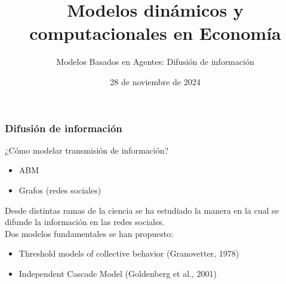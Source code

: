 \documentclass[11pt]{beamer}
\begin{document}
	\title{Modelos dinámicos y computacionales en Economía}
	\subtitle{Modelos Basados en Agentes: Difusión de información}
	\date{28 de noviembre de 2024}




\begin{frame}
	\frametitle{Difusión de información}
	¿Cómo modelar transmisión de información?
	\begin{itemize}
		\item<2-> ABM
		\item<3-> Grafos (redes sociales)
	\end{itemize}
	\vspace{2mm}
	Desde distintas ramas de la ciencia se ha estudiado la manera en la cual se difunde la información en las redes sociales.\\
	Dos modelos fundamentales se han propuesto:
	\begin{itemize}
		\item Threshold models of collective behavior (Granovetter, 1978)
		\item Independent Cascade Model (Goldenberg et al., 2001)
	\end{itemize}
\end{frame}
\end{document}
